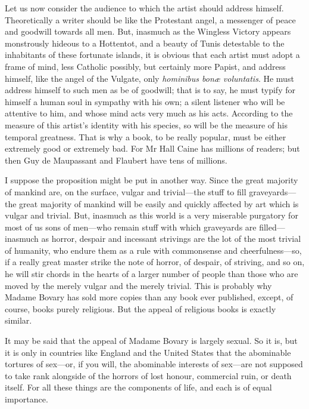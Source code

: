 Let us now consider the audience to which the artist should address
himself. Theoretically a writer should be like the Protestant angel, a
messenger of peace and goodwill towards all men. But, inasmuch as the
Wingless Victory appears monstrously hideous to a Hottentot, and a
beauty of Tunis detestable to the inhabitants of these fortunate
islands, it is obvious that each artist must adopt a frame of mind, less
Catholic possibly, but certainly more Papist, and address himself, like
the angel of the Vulgate, only \emph{hominibus bonæ voluntatis}. He must
address himself to such men as be of goodwill; that is to say, he must
typify for himself a human soul in sympathy with his own; a silent
listener who will be attentive to him, and whose mind acts very much as
his acts. According to the measure of this artist's identity with his
species, so will be the measure of his temporal greatness. That is why a
book, to be really popular, must be either extremely good or extremely
bad. For Mr Hall Caine has millions of readers; but then Guy de
Maupassant and Flaubert have tens of millions.

I suppose the proposition might be put in another way. Since the great
majority of mankind are, on the surface, vulgar and trivial---the stuff
to fill graveyards---the great majority of mankind will be easily and
quickly affected by art which is vulgar and trivial. But, inasmuch as
this world is a very miserable purgatory for most of us sons of
men---who remain stuff with which graveyards are filled---inasmuch as
horror, despair and incessant strivings are the lot of the most trivial
of humanity, who endure them as a rule with commonsense and
cheerfulness---so, if a really great master strike the note of horror,
of despair, of striving, and so on, he will stir chords in the hearts of
a larger number of people than those who are moved by the merely vulgar
and the merely trivial. This is probably why Madame Bovary has sold more
copies than any book ever published, except, of course, books purely
religious. But the appeal of religious books is exactly similar.

It may be said that the appeal of Madame Bovary is largely sexual. So it
is, but it is only in countries like England and the United States that
the abominable tortures of sex---or, if you will, the abominable
interests of sex---are not supposed to take rank alongside of the
horrors of lost honour, commercial ruin, or death itself. For all these
things are the components of life, and each is of equal importance.

